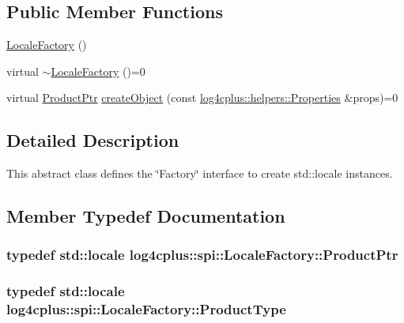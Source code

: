 \subsection*{Public Member Functions}
\begin{DoxyCompactItemize}
\item 
\hyperlink{classlog4cplus_1_1spi_1_1LocaleFactory_a686c0e50b6c2e6ff40a52953ffe83fdc}{Locale\-Factory} ()
\item 
virtual \hyperlink{classlog4cplus_1_1spi_1_1LocaleFactory_acb27156a76df989b86aaf7850c46d51a}{$\sim$\-Locale\-Factory} ()=0
\item 
virtual \hyperlink{classlog4cplus_1_1spi_1_1LocaleFactory_addc3507088f239b580e4c7691b67919f}{Product\-Ptr} \hyperlink{classlog4cplus_1_1spi_1_1LocaleFactory_add8f60357070e2862acaa8c56ad3228c}{create\-Object} (const \hyperlink{classlog4cplus_1_1helpers_1_1Properties}{log4cplus\-::helpers\-::\-Properties} \&props)=0
\end{DoxyCompactItemize}


\subsection{Detailed Description}
This abstract class defines the \char`\"{}\-Factory\char`\"{} interface to create std\-::locale instances. 

\subsection{Member Typedef Documentation}
\hypertarget{classlog4cplus_1_1spi_1_1LocaleFactory_addc3507088f239b580e4c7691b67919f}{
\subsubsection[{Product\-Ptr}]{\setlength{\rightskip}{0pt plus 5cm}typedef std\-::locale {\bf log4cplus\-::spi\-::\-Locale\-Factory\-::\-Product\-Ptr}}}\label{classlog4cplus_1_1spi_1_1LocaleFactory_addc3507088f239b580e4c7691b67919f}
\hypertarget{classlog4cplus_1_1spi_1_1LocaleFactory_ae07f0f49c136b8930f8f398c454fff74}{
\subsubsection[{Product\-Type}]{\setlength{\rightskip}{0pt plus 5cm}typedef std\-::locale {\bf log4cplus\-::spi\-::\-Locale\-Factory\-::\-Product\-Type}}}\label{classlog4cplus_1_1spi_1_1LocaleFactory_ae07f0f49c136b8930f8f398c454fff74}


